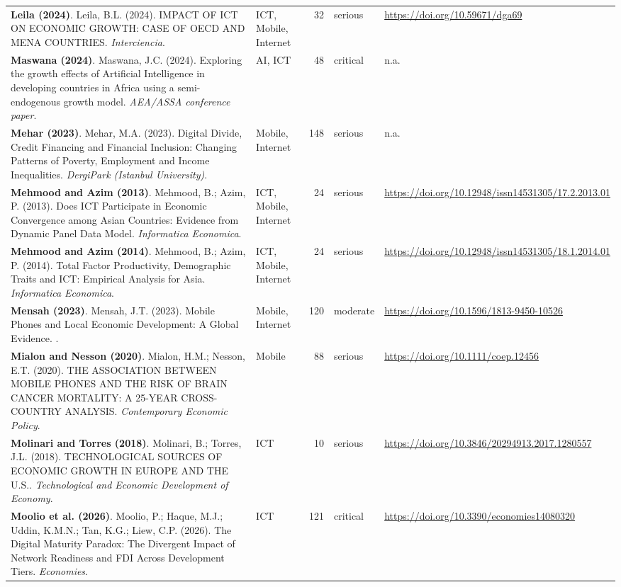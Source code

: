 {\begin{longtable}{@{}p{7.4cm} p{1.3cm} r l p{3.4cm}@{}}
\textbf{Leila (2024)}. Leila, B.L. (2024). IMPACT OF ICT ON ECONOMIC GROWTH: CASE OF OECD AND MENA COUNTRIES. \emph{Interciencia}. & ICT, Mobile, Internet & 32 & serious & \url{https://doi.org/10.59671/dga69} \\
\textbf{Maswana (2024)}. Maswana, J.C. (2024). Exploring the growth effects of Artificial Intelligence in developing countries in Africa using a semi-endogenous growth model. \emph{AEA/ASSA conference paper}. & AI, ICT & 48 & critical & n.a. \\
\textbf{Mehar (2023)}. Mehar, M.A. (2023). Digital Divide, Credit Financing and Financial Inclusion: Changing Patterns of Poverty, Employment and Income Inequalities. \emph{DergiPark (Istanbul University)}. & Mobile, Internet & 148 & serious & n.a. \\
\textbf{Mehmood and Azim (2013)}. Mehmood, B.; Azim, P. (2013). Does ICT Participate in Economic Convergence among Asian Countries: Evidence from Dynamic Panel Data Model. \emph{Informatica Economica}. & ICT, Mobile, Internet & 24 & serious & \url{https://doi.org/10.12948/issn14531305/17.2.2013.01} \\
\textbf{Mehmood and Azim (2014)}. Mehmood, B.; Azim, P. (2014). Total Factor Productivity, Demographic Traits and ICT: Empirical Analysis for Asia. \emph{Informatica Economica}. & ICT, Mobile, Internet & 24 & serious & \url{https://doi.org/10.12948/issn14531305/18.1.2014.01} \\
\textbf{Mensah (2023)}. Mensah, J.T. (2023). Mobile Phones and Local Economic Development: A Global Evidence. \emph{}. & Mobile, Internet & 120 & moderate & \url{https://doi.org/10.1596/1813-9450-10526} \\
\textbf{Mialon and Nesson (2020)}. Mialon, H.M.; Nesson, E.T. (2020). THE ASSOCIATION BETWEEN MOBILE PHONES AND THE RISK OF BRAIN CANCER MORTALITY: A 25-YEAR CROSS-COUNTRY ANALYSIS. \emph{Contemporary Economic Policy}. & Mobile & 88 & serious & \url{https://doi.org/10.1111/coep.12456} \\
\textbf{Molinari and Torres (2018)}. Molinari, B.; Torres, J.L. (2018). TECHNOLOGICAL SOURCES OF ECONOMIC GROWTH IN EUROPE AND THE U.S.. \emph{Technological and Economic Development of Economy}. & ICT & 10 & serious & \url{https://doi.org/10.3846/20294913.2017.1280557} \\
\textbf{Moolio et al. (2026)}. Moolio, P.; Haque, M.J.; Uddin, K.M.N.; Tan, K.G.; Liew, C.P. (2026). The Digital Maturity Paradox: The Divergent Impact of Network Readiness and FDI Across Development Tiers. \emph{Economies}. & ICT & 121 & critical & \url{https://doi.org/10.3390/economies14080320} \\

\end{longtable}}
